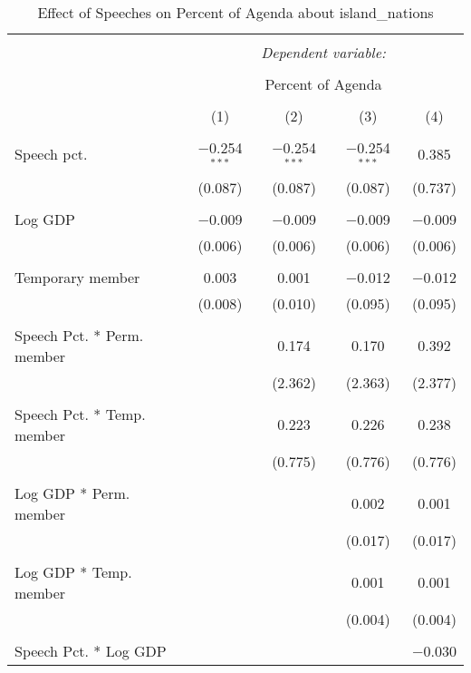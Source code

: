 
\begin{table}[!htbp] \centering 
  \caption{Effect of Speeches on Percent of Agenda about  island_nations} 
  \label{} 
\begin{tabular}{@{\extracolsep{5pt}}lcccc} 
\\[-1.8ex]\hline 
\hline \\[-1.8ex] 
 & \multicolumn{4}{c}{\textit{Dependent variable:}} \\ 
\cline{2-5} 
\\[-1.8ex] & \multicolumn{4}{c}{Percent of Agenda} \\ 
\\[-1.8ex] & (1) & (2) & (3) & (4)\\ 
\hline \\[-1.8ex] 
 Speech pct. & $-$0.254$^{***}$ & $-$0.254$^{***}$ & $-$0.254$^{***}$ & 0.385 \\ 
  & (0.087) & (0.087) & (0.087) & (0.737) \\ 
  & & & & \\ 
 Log GDP & $-$0.009 & $-$0.009 & $-$0.009 & $-$0.009 \\ 
  & (0.006) & (0.006) & (0.006) & (0.006) \\ 
  & & & & \\ 
 Temporary member & 0.003 & 0.001 & $-$0.012 & $-$0.012 \\ 
  & (0.008) & (0.010) & (0.095) & (0.095) \\ 
  & & & & \\ 
 Speech Pct. * Perm. member &  & 0.174 & 0.170 & 0.392 \\ 
  &  & (2.362) & (2.363) & (2.377) \\ 
  & & & & \\ 
 Speech Pct. * Temp. member &  & 0.223 & 0.226 & 0.238 \\ 
  &  & (0.775) & (0.776) & (0.776) \\ 
  & & & & \\ 
 Log GDP * Perm. member &  &  & 0.002 & 0.001 \\ 
  &  &  & (0.017) & (0.017) \\ 
  & & & & \\ 
 Log GDP * Temp. member &  &  & 0.001 & 0.001 \\ 
  &  &  & (0.004) & (0.004) \\ 
  & & & & \\ 
 Speech Pct. * Log GDP &  &  &  & $-$0.030 \\ 

\end{tabular}
\end{table}
